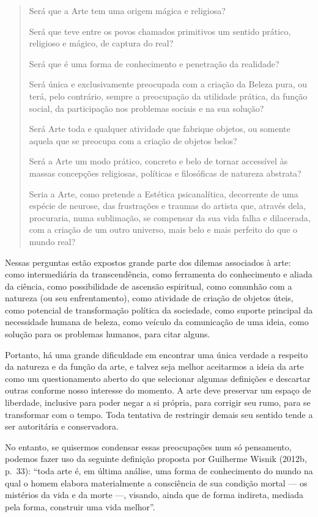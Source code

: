 \begin{quote}
Será que a Arte tem uma origem mágica e religiosa?

Será que teve entre os povos chamados primitivos um sentido prático,
religioso e mágico, de captura do real?

Será que é uma forma de conhecimento e penetração da realidade?

Será única e exclusivamente preocupada com a criação da Beleza pura, ou
terá, pelo contrário, sempre a preocupação da utilidade prática, da
função social, da participação nos problemas sociais e na sua solução?

Será Arte toda e qualquer atividade que fabrique objetos, ou somente
aquela que se preocupa com a criação de objetos belos?

Será a Arte um modo prático, concreto e belo de tornar accessível às
massas concepções religiosas, políticas e filosóficas de natureza
abstrata?

Seria a Arte, como pretende a Estética psicanalítica, decorrente de uma
espécie de neurose, das frustrações e traumas do artista que, através
dela, procuraria, numa sublimação, se compensar da sua vida falha e
dilacerada, com a criação de um outro universo, mais belo e mais
perfeito do que o mundo real?
\end{quote}

Nessas perguntas estão expostos grande parte dos dilemas associados à
arte: como intermediária da transcendência, como ferramenta do
conhecimento e aliada da ciência, como possibilidade de ascensão
espiritual, como comunhão com a natureza (ou seu enfrentamento), como
atividade de criação de objetos úteis, como potencial de transformação
política da sociedade, como suporte principal da necessidade humana de
beleza, como veículo da comunicação de uma ideia, como solução para os
problemas humanos, para citar alguns.

Portanto, há uma grande dificuldade em encontrar uma única verdade a
respeito da natureza e da função da arte, e talvez seja melhor
aceitarmos a ideia da arte como um questionamento aberto do que
selecionar algumas definições e descartar outras conforme nosso
interesse do momento. A arte deve preservar um espaço de liberdade,
inclusive para poder negar a si própria, para corrigir seu rumo, para se
transformar com o tempo. Toda tentativa de restringir demais seu sentido
tende a ser autoritária e conservadora.

No entanto, se quisermos condensar essas preocupações num só pensamento,
podemos fazer uso da seguinte definição proposta por Guilherme Wisnik
(2012b, p.~33): ``toda arte é, em última análise, uma forma de
conhecimento do mundo na qual o homem elabora materialmente a
consciência de sua condição mortal --- os mistérios da vida e da morte
---, visando, ainda que de forma indireta, mediada pela forma, construir
uma vida melhor''.

